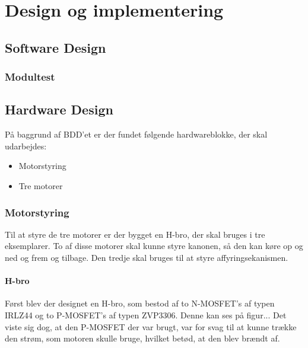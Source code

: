 \chapter{Design og implementering}


\section{Software Design}

\subsection{Modultest}



\section{Hardware Design}
På baggrund af BDD'et er der fundet følgende hardwareblokke, der skal udarbejdes: 
\begin{itemize}
	\item Motorstyring
	\item Tre motorer
\end{itemize}

\subsection{Motorstyring}
Til at styre de tre motorer er der bygget en H-bro, der skal bruges i tre eksemplarer. To af disse motorer skal kunne styre kanonen, så den kan køre op og ned og frem og tilbage. Den tredje skal bruges til at styre affyringsekanismen. 

\subsubsection{H-bro}
Først blev der designet en H-bro, som bestod af to N-MOSFET's af typen IRLZ44 og to P-MOSFET's af typen ZVP3306. Denne kan ses på figur... Det viste sig dog, at den P-MOSFET der var brugt, var for svag til at kunne trække den strøm, som motoren skulle bruge, hvilket betød, at den blev brændt af. 

